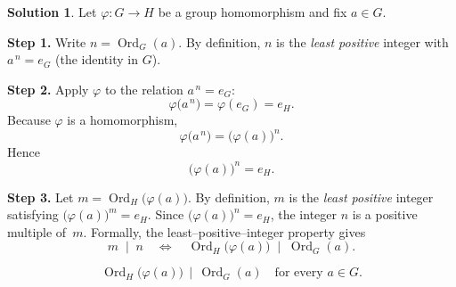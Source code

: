 \documentclass[12pt]{article}
\DeclareMathOperator{\ord}{Ord}
\theoremstyle{definition} %
\newtheorem{solution}{Solution}
\theoremstyle{plain} %
\begin{document}
          \begin{solution}
            Let $\varphi:G\longrightarrow H$ be a group homomorphism and
            fix $a\in G$.
            
            \medskip
            \noindent
            \textbf{Step 1.\;}  Write $n=\ord_{G}(a)$.  
            By definition, $n$ is the \emph{least positive} integer with
            $a^{\,n}=e_{G}$ (the identity in $G$).
            
            \medskip
            \noindent
            \textbf{Step 2.\;}  Apply $\varphi$ to the relation $a^{\,n}=e_{G}$:
            \[
               \varphi\!\bigl(a^{\,n}\bigr)
               =\varphi(e_{G})
               =e_{H}.
            \]
            Because $\varphi$ is a homomorphism,
            \[
               \varphi\!\bigl(a^{\,n}\bigr)
                  =\bigl(\varphi(a)\bigr)^{n}.
            \]
            Hence
            \[
               \bigl(\varphi(a)\bigr)^{n}=e_{H}.
            \]
            
            \medskip
            \noindent
            \textbf{Step 3.\;}  Let $m=\ord_{H}\!\bigl(\varphi(a)\bigr)$.  
            By definition, $m$ is the \emph{least positive} integer satisfying
            \(
               \bigl(\varphi(a)\bigr)^{m}=e_{H}.
            \)
            Since $\bigl(\varphi(a)\bigr)^{n}=e_{H}$, the integer $n$ is a positive
            multiple of~$m$.  
            Formally, the least–positive–integer property gives
            \[
               m \;\mid\; n
               \quad\Longleftrightarrow\quad
               \ord_{H}\!\bigl(\varphi(a)\bigr)
                 \;\mid\;
               \ord_{G}(a).
            \]
            
            \medskip
            \[
               \boxed{\;
                  \ord_{H}\!\bigl(\varphi(a)\bigr)
                  \,\mid\,
                  \ord_{G}(a)
                  \quad\text{for every }a\in G.
               \;}
            \]
            \end{solution}
\end{document}
